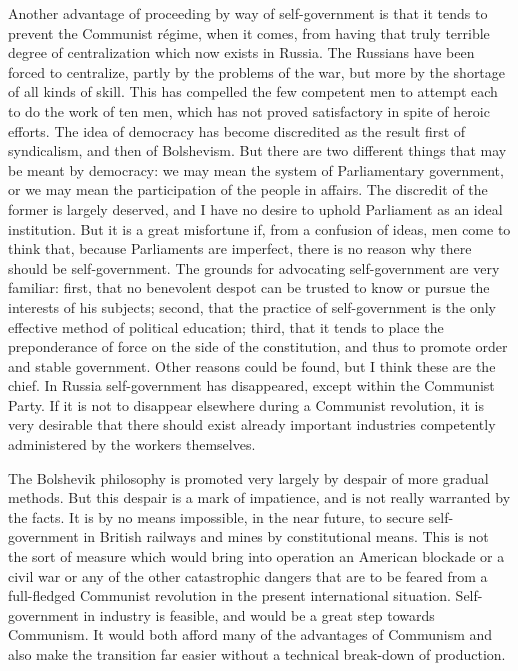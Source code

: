 Another advantage of proceeding by way of self-government is that it tends to prevent the Communist régime, when it comes, from having that truly terrible degree of centralization which now exists in Russia. The Russians have been forced to centralize, partly by the problems of the war, but more by the shortage of all kinds of skill. This has compelled the few competent men to attempt each to do the work of ten men, which has not proved satisfactory in spite of heroic efforts. The idea of democracy has become discredited as the result first of syndicalism, and then of Bolshevism. But there are two different things that may be meant by democracy: we may mean the system of Parliamentary government, or we may mean the participation of the people in affairs. The discredit of the former is largely deserved, and I have no desire to uphold Parliament as an ideal institution. But it is a great misfortune if, from a confusion of ideas, men come to think that, because Parliaments are imperfect, there is no reason why there should be self-government. The grounds for advocating self-government are very familiar: first, that no benevolent despot can be trusted to know or pursue the interests of his subjects; second, that the practice of self-government is the only effective method of political education; third, that it tends to place the preponderance of force on the side of the constitution, and thus to promote order and stable government. Other reasons could be found, but I think these are the chief. In Russia self-government has disappeared, except within the Communist Party. If it is not to disappear elsewhere during a Communist revolution, it is very desirable that there should exist already important industries competently administered by the workers themselves.

The Bolshevik philosophy is promoted very largely by despair of more gradual methods. But this despair is a mark of impatience, and is not really warranted by the facts. It is by no means impossible, in the near future, to secure self-government in British railways and mines by constitutional means. This is not the sort of measure which would bring into operation an American blockade or a civil war or any of the other catastrophic dangers that are to be feared from a full-fledged Communist revolution in the present international situation. Self-government in industry is feasible, and would be a great step towards Communism. It would both afford many of the advantages of Communism and also make the transition far easier without a technical break-down of production.

